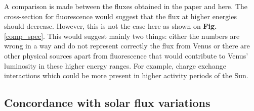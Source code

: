     A comparison is made between the fluxes obtained in the \cite{Dennerl2002DiscoveryChandra} paper and here. The cross-section for fluorescence would suggest that the flux at higher energies should decrease. However, this is not the case here as shown on \textbf{Fig.} \ref{comp_spec}. This would suggest mainly two things: either the numbers are wrong in a way and do not represent correctly the flux from Venus or there are other physical sources apart from fluorescence that would contribute to Venus' luminosity in these higher energy ranges. For example, charge exchange interactions which could be more present in higher activity periods of the Sun\cite{BhardwajX-raysObjects}.
    
    \subsection{Concordance with solar flux variations}

